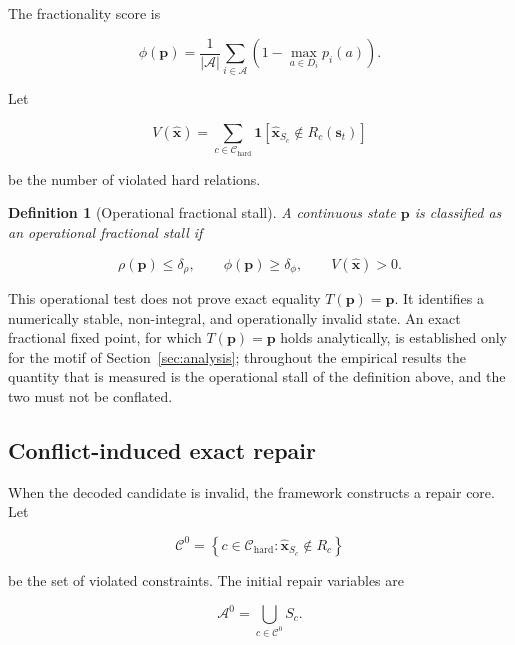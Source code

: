 \documentclass[pdflatex,sn-mathphys-num,iicol,oneside]{sn-jnl}
\newtheorem{definition}{Definition}
\begin{document}
The fractionality score is

\begin{equation}
\phi(\bm{p})
=
\frac{1}{|\mathcal{A}|}
\sum_{i\in\mathcal{A}}
\left(
1-\max_{a\in D_i}p_i(a)
\right).
\label{eq:fractionality}
\end{equation}

Let

\begin{equation}
V(\widehat{\bm{x}})
=
\sum_{c\in\mathcal{C}_{\mathrm{hard}}}
\mathbf{1}
\left[
\widehat{\bm{x}}_{S_c}
\notin R_c(\bm{s}_t)
\right]
\label{eq:violations}
\end{equation}

be the number of violated hard relations.

\begin{definition}[Operational fractional stall]
A continuous state $\bm{p}$ is classified as an operational
fractional stall if

\begin{equation}
\rho(\bm{p})\leq\delta_{\rho},
\qquad
\phi(\bm{p})\geq\delta_{\phi},
\qquad
V(\widehat{\bm{x}})>0.
\end{equation}
\end{definition}

This operational test does not prove exact equality
$T(\bm{p})=\bm{p}$. It identifies a numerically stable, non-integral,
and operationally invalid state. An exact fractional fixed point, for
which $T(\bm{p})=\bm{p}$ holds analytically, is established only for
the motif of Section~\ref{sec:analysis}; throughout the empirical
results the quantity that is measured is the operational stall of the
definition above, and the two must not be conflated.

\subsection{Conflict-induced exact repair}

When the decoded candidate is invalid, the framework constructs a
repair core. Let

\begin{equation}
\mathcal{C}^{0}
=
\left\{
c\in\mathcal{C}_{\mathrm{hard}}:
\widehat{\bm{x}}_{S_c}\notin R_c
\right\}
\end{equation}

be the set of violated constraints. The initial repair variables are

\begin{equation}
\mathcal{A}^{0}
=
\bigcup_{c\in\mathcal{C}^{0}}S_c.
\end{equation}
\end{document}
